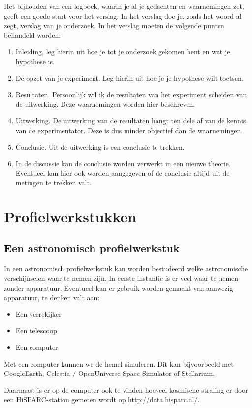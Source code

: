 Het bijhouden van een logboek, waarin je al je gedachten en waarnemingen
zet, geeft een goede start voor het verslag. In het verslag doe je,
zoals het woord al zegt, verslag van je onderzoek. In het verslag
moeten de volgende punten behandeld worden:
\begin{enumerate}
\item Inleiding, leg hierin uit hoe je tot je onderzoek gekomen bent en
wat je hypothese is.
\item De opzet van je experiment. Leg hierin uit hoe je je hypothese wilt
toetsen.
\item Resultaten. Persoonlijk wil ik de resultaten van het experiment scheiden
van de uitwerking. Deze waarnemingen worden hier beschreven.
\item Uitwerking. De uitwerking van de resultaten hangt ten dele af van
de kennis van de experimentator. Deze is dus minder objectief dan
de waarnemingen.
\item Conclusie. Uit de uitwerking is een conclusie te trekken.
\item In de discussie kan de conclusie worden verwerkt in een nieuwe theorie.
Eventueel kan hier ook worden aangegeven of de conclusie altijd uit
de metingen te trekken valt.
\end{enumerate}

\section{Profielwerkstukken}


\subsection{Een astronomisch profielwerkstuk}

In een astronomisch profielwerkstuk kan worden bestudeerd welke astronomische
verschijnselen waar te nemen zijn. In eerste instantie is er veel
waar te nemen zonder apparatuur. Eventueel kan er gebruik worden gemaakt
van aanwezig apparatuur, te denken valt aan:
\begin{itemize}
\item Een verrekijker
\item Een telescoop
\item Een computer
\end{itemize}
Met een computer kunnen we de hemel simuleren. Dit kan bijvoorbeeld
met GoogleEarth, Celestia / OpenUniverse Space Simulator of Stellarium.

Daarnaast is er op de computer ook te vinden hoeveel kosmische straling
er door een HiSPARC-station gemeten wordt op \url{http://data.hisparc.nl/}.

